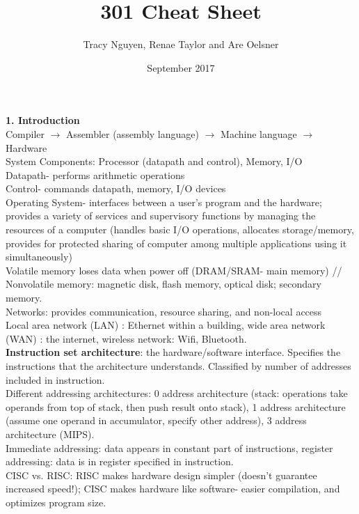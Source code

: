 \documentclass{article}
\title{301 Cheat Sheet}
\author{Tracy Nguyen, Renae Taylor and Are Oelsner}
\date{September 2017}
\begin{document}
\textbf{1. Introduction}\\ 
Compiler $\rightarrow$ Assembler (assembly language) $\rightarrow$ Machine
language $\rightarrow$ Hardware \\
System Components: Processor (datapath and control), Memory, I/O \\
Datapath- performs arithmetic operations \\
Control- commands datapath, memory, I/O devices \\
Operating System- interfaces between a user's program and the hardware; provides
a variety of services and supervisory functions by managing the resources of a
computer (handles basic I/O operations, allocates storage/memory, provides for
protected sharing of computer among multiple applications using it
simultaneously)\\
Volatile memory loses data when power off (DRAM/SRAM- main memory) //
Nonvolatile memory: magnetic disk, flash memory, optical disk; secondary memory.
\\
Networks: provides communication, resource sharing, and non-local access \\
Local area network (LAN) : Ethernet within a building, wide area network (WAN) :
the internet, wireless network: Wifi, Bluetooth.\\
\textbf{Instruction set architecture}: the hardware/software interface.
Specifies the instructions that the architecture understands. Classified by
number of addresses included in instruction. \\
Different addressing architectures: 0 address architecture (stack: operations
take operands from top of stack, then push result onto stack), 1 address
architecture (assume one operand in accumulator, specify other address), 3
address architecture (MIPS).\\
Immediate addressing: data appears in constant part of instructions, register
addressing: data is in register specified in instruction. \\
CISC vs. RISC: RISC makes hardware design simpler (doesn't guarantee increased
speed!); CISC makes hardware like software- easier compilation, and optimizes
program size.\\
\end{document}
